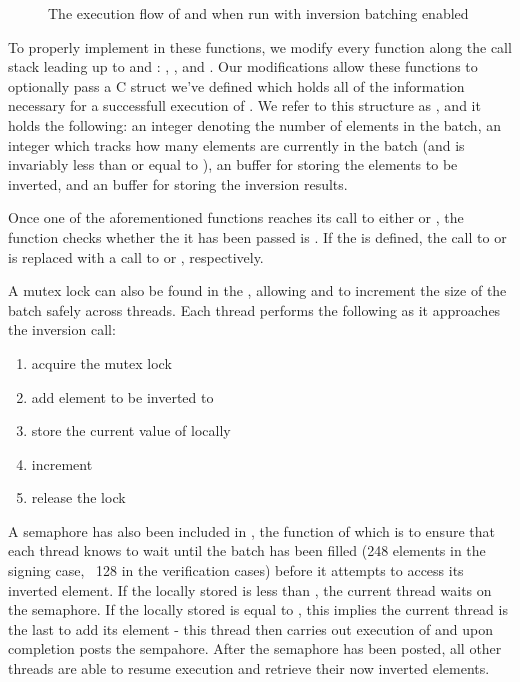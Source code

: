 \begin{figure}[!h]
\begin{tikzpicture}
\end{tikzpicture}
\caption{The execution flow of  and  when run with inversion batching enabled}
\end{figure}

To properly implement  in these functions, we modify every function along the call stack leading up to  and : , , and . Our modifications allow these functions to optionally pass a C struct we've defined which holds all of the information necessary for a successfull execution of . We refer to this structure as , and it holds the following: an integer  denoting the number of elements in the batch, an integer  which tracks how many elements are currently in the batch (and is invariably less than or equal to ), an  buffer  for storing the elements to be inverted, and an  buffer  for storing the inversion results.

Once one of the aforementioned  functions reaches its call to either  or , the function checks whether the  it has been passed is . If the  is defined, the call to  or  is replaced with a call to  or , respectively.

A mutex lock can also be found in the , allowing  and  to increment the size of the batch safely across threads. Each thread performs the following as it approaches the inversion call:
\begin{enumerate}
\item acquire the mutex lock
\item add element to be inverted to 
\item store the current value of  locally
\item increment 
\item release the lock
\end{enumerate}

A semaphore has also been included in , the function of which is to ensure that each thread knows to wait until the batch has been filled (248 elements in the signing case, ~128 in the verification cases) before it attempts to access its inverted element. If the locally stored  is less than , the current thread waits on the semaphore. If the locally stored  is equal to , this implies the current thread is the last to add its element - this thread then carries out execution of  and upon completion posts the sempahore. After the semaphore has been posted, all other threads are able to resume execution and retrieve their now inverted elements.\\

